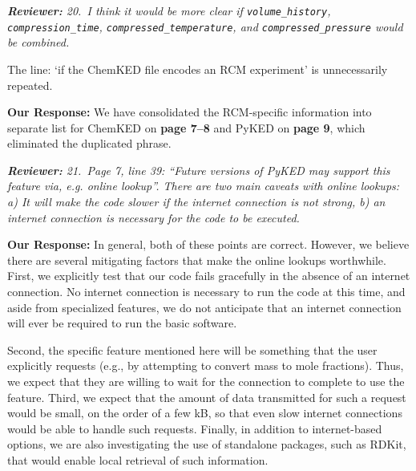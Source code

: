 \documentclass[a4paper,10pt]{elsarticle}
\newenvironment{reviewer}{\vspace{0.5\baselineskip}\begingroup\itshape\textbf{Reviewer:}}{\endgroup}
\newenvironment{response}{\textbf{Our Response:}}{\vspace{0.5\baselineskip}}
\begin{document}
\begin{reviewer}
    20.~I think it would be more clear if \texttt{volume\_history}, \texttt{compression\_time},
    \texttt{compressed\_temperature}, and \texttt{compressed\_pressure} would be combined.

    The line: `if the ChemKED file encodes an RCM experiment' is unnecessarily repeated.
\end{reviewer}

\begin{response}
    We have consolidated the RCM-specific information into separate list for ChemKED on
    \textbf{page 7--8} and PyKED on \textbf{page 9}, which eliminated the
    duplicated phrase.
\end{response}

\begin{reviewer}
    21.~Page 7, line 39: ``Future versions of PyKED may support this feature via, e.g. online
    lookup''. There are two main caveats with online lookups: a) It will make the code slower if the
    internet connection is not strong, b) an internet connection is necessary for the code to be
    executed.
\end{reviewer}

\begin{response}
    In general, both of these points are correct. However, we believe there are several mitigating
    factors that make the online lookups worthwhile. First, we explicitly test that our code fails
    gracefully in the absence of an internet connection. No internet connection is necessary to run
    the code at this time, and aside from specialized features, we do not anticipate that an
    internet connection will ever be required to run the basic software.

    Second, the specific feature mentioned here will be something that the user explicitly requests (e.g., by
    attempting to convert mass to mole fractions). Thus, we expect that they are willing to wait for
    the connection to complete to use the feature. Third, we expect that the amount of data
    transmitted for such a request would be small, on the order of a few kB, so that even slow
    internet connections would be able to handle such requests. Finally, in addition to
    internet-based options, we are also investigating the use of standalone packages, such as RDKit,
    that would enable local retrieval of such information.
\end{response}
\end{document}
